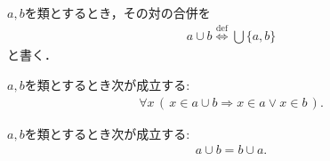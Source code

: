 	$a,b$を類とするとき，その対の合併を
	\begin{align}
		a \cup b \overset{\mathrm{def}}{\Longleftrightarrow} \bigcup \{a,b\}
	\end{align}
	と書く．
	
	\begin{screen}
		\begin{thm}
			$a,b$を類とするとき次が成立する:
			\begin{align}
				\forall x\, (\, x \in a \cup b \Longrightarrow x \in a \vee x \in b\, ).
			\end{align}
		\end{thm}
	\end{screen}
	
	\begin{screen}
		\begin{thm}[合併の可換律]
			$a,b$を類とするとき次が成立する:
			\begin{align}
				a \cup b = b \cup a.
			\end{align}
		\end{thm}
	\end{screen}